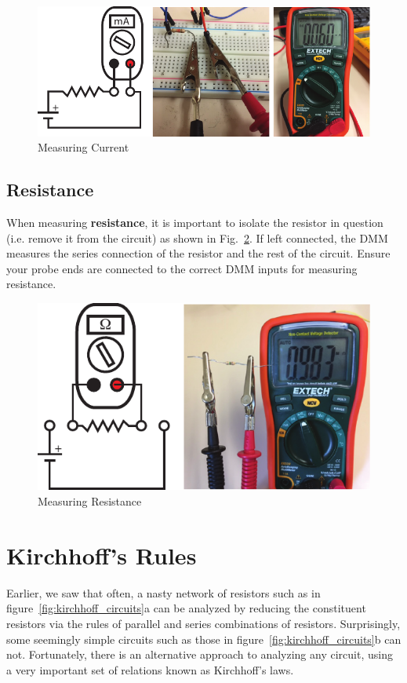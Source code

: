 \documentclass{tufte-book}
\begin{document}
\begin{figure}[h]
\caption{Measuring Current}
\label{fig:meascurr}
\begin{center}
\includegraphics{DMM_current_meas.pdf}
\end{center}
\end{figure}

\subsection*{Resistance}

When measuring \textbf{resistance}, it is important to isolate the resistor in question (i.e. remove it from the circuit) as shown in Fig.~\ref{fig:measres}. 
If left connected, the DMM measures the series connection of the resistor and the rest of the circuit. 
Ensure your probe ends are connected to the correct DMM inputs for measuring resistance. 

\begin{figure}[h]
\caption{Measuring Resistance}
\label{fig:measres}
\begin{center}
\includegraphics[width=0.7\linewidth]{DMM_resistance_meas.pdf}
\end{center}
\end{figure}

\section{Kirchhoff's Rules}\label{sec:kirchhoff}
Earlier, we saw that often, a nasty network of resistors such as in figure~\ref{fig:kirchhoff_circuits}a can be analyzed by reducing the constituent resistors via the rules of parallel and series combinations of resistors. Surprisingly, some seemingly simple circuits such as those in figure~\ref{fig:kirchhoff_circuits}b can not. Fortunately, there is an alternative approach to analyzing any circuit, using a very important set of relations known as Kirchhoff's laws.
\end{document}

